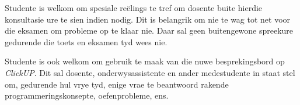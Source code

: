         Studente is welkom om spesiale re\"{e}lings te tref om dosente buite
        hierdie konsultasie ure te sien indien nodig.  Dit is belangrik om nie
        te wag tot net voor die eksamen om probleme op te klaar nie.  Daar sal
        geen buitengewone spreekure gedurende die toets en eksamen tyd wees
        nie.

        Studente is ook welkom om gebruik te maak van die nuwe besprekingsbord
        op \textit{ClickUP}.  Dit sal dosente, onderwysassistente en ander
        medestudente in staat stel om, gedurende hul vrye tyd, enige vrae te
        beantwoord rakende programmeringskonsepte, oefenprobleme, ens.
